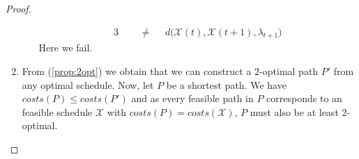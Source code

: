 \documentclass[hidelinks]{article}
\theoremstyle{plain}
\theoremstyle{definition}
\theoremstyle{rem}
\newcommand{\mx}{\mathcal{X}}
\begin{document}
\begin{sloppypar}
\begin{proof}
\begin{enumerate}
\begin{enumerate}[(i)]
\begin{alignat*}{3}
			&&&\ne&&d\bigl(\mx(t),\mx(t+1),\lambda_{t+1}\bigr)
		\end{alignat*}
		Here we fail.
	\end{enumerate}
	\item From (\ref{prop:2opt}) we obtain that we can construct a $2$-optimal path $P'$ from any optimal schedule. Now, let $P$ be a shortest path. We have $costs(P)\le costs(P')$ and as every feasible path in $P$ corresponds to an feasible schedule $\mx$ with $costs(P)=costs(\mx)$, $P$ must also be at least $2$-optimal.
\end{enumerate}
\end{proof}

\end{sloppypar}
\end{document}
